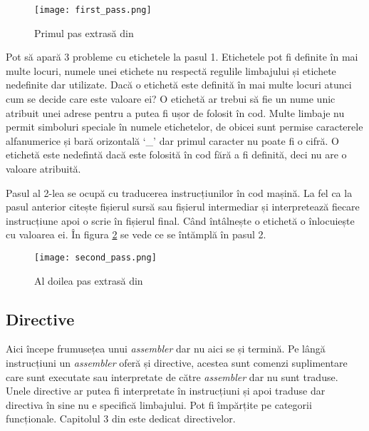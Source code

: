 \documentclass[../main.tex]{subfiles}
\begin{document}
\begin{figure}[h]
    \centering
    \texttt{[image: first\_pass.png]}
    \caption{Primul pas extrasă din \cite{asl}}
    \label{fig:first_pass}
\end{figure}

Pot să apară 3 probleme cu etichetele la pasul 1. Etichetele pot fi definite în mai multe locuri, numele unei etichete
nu respectă regulile limbajului și etichete nedefinite dar utilizate. Dacă o etichetă este definită în mai multe locuri
atunci cum se decide care este valoare ei? O etichetă ar trebui să fie un nume unic atribuit unei adrese pentru a putea
fi ușor de folosit în cod. Multe limbaje nu permit simboluri speciale în numele etichetelor, de obicei sunt permise
caracterele alfanumerice și bară orizontală `\_' dar primul caracter nu poate fi o cifră. O etichetă este nedefintă dacă
este folosită în cod fără a fi definită, deci nu are o valoare atribuită.

Pasul al 2-lea se ocupă cu traducerea instrucțiunilor în cod mașină. La fel ca la pasul anterior citește fișierul
sursă sau fișierul intermediar și interpretează fiecare instrucțiune apoi o scrie în fișierul final. Când întâlnește
o etichetă o înlocuiește cu valoarea ei. În figura \ref{fig:second_pass} se vede ce se întămplă în pasul 2.

\begin{figure}[h]
    \centering
    \texttt{[image: second\_pass.png]}
    \caption{Al doilea pas extrasă din \cite{asl}}
    \label{fig:second_pass}
\end{figure}

\clearpage
\subsection{Directive}
Aici începe frumusețea unui \emph{assembler} dar nu aici se și termină. Pe lângă instrucțiuni un \emph{assembler} oferă
și directive, acestea sunt comenzi suplimentare care sunt executate sau interpretate de către \emph{assembler} dar nu 
sunt traduse. Unele directive ar putea fi interpretate în instrucțiuni și apoi traduse dar directiva în sine nu e
specifică limbajului. Pot fi împărțite pe categorii funcționale. Capitolul 3 din \cite{asl} este dedicat directivelor.
\end{document}
